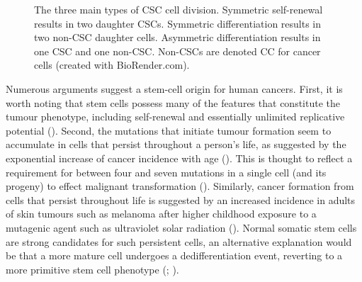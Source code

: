 \documentclass[
  letterpaper,
]{scrreprt}
\theoremstyle{definition}
\theoremstyle{remark}
\begin{document}
\begin{figure}


\caption{\label{fig-types-csc-div}The three main types of CSC cell
division. Symmetric self-renewal results in two daughter CSCs. Symmetric
differentiation results in two non-CSC daughter cells. Asymmetric
differentiation results in one CSC and one non-CSC. Non-CSCs are denoted
CC for cancer cells (created with BioRender.com).}

\end{figure}%

Numerous arguments suggest a stem-cell origin for human cancers. First,
it is worth noting that stem cells possess many of the features that
constitute the tumour phenotype, including self-renewal and essentially
unlimited replicative potential (). Second, the mutations that initiate tumour formation
seem to accumulate in cells that persist throughout a person's life, as
suggested by the exponential increase of cancer incidence with age
(). This is thought to reflect
a requirement for between four and seven mutations in a single cell (and
its progeny) to effect malignant transformation
(). Similarly,
cancer formation from cells that persist throughout life is suggested by
an increased incidence in adults of skin tumours such as melanoma after
higher childhood exposure to a mutagenic agent such as ultraviolet solar
radiation (). Normal somatic stem
cells are strong candidates for such persistent cells, an alternative
explanation would be that a more mature cell undergoes a
dedifferentiation event, reverting to a more primitive stem cell
phenotype (;
).
\end{document}
